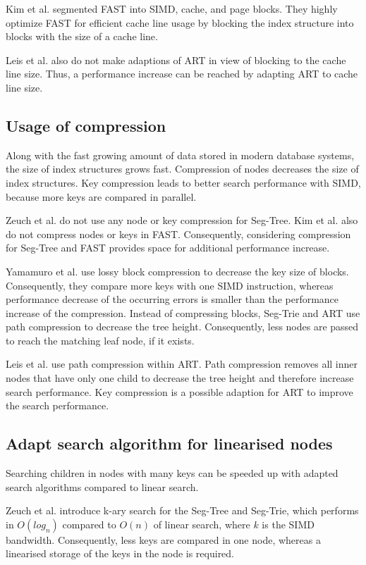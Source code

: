 \documentclass[conference]{IEEEtran}
\begin{document}
Kim et al. segmented FAST into SIMD, cache, and page blocks. They highly optimize FAST for efficient cache line usage by blocking the index structure into blocks with the size of a cache line.

Leis et al. also do not make adaptions of ART in view of blocking to the cache line size. Thus, a performance increase can be reached by adapting ART to cache line size.
\subsection{Usage of compression}
Along with the fast growing amount of data stored in modern database systems, the size of index structures grows fast. Compression of nodes decreases the size of index structures. Key compression leads to better search performance with SIMD, because more keys are compared in parallel.

Zeuch et al. do not use any node or key compression for Seg-Tree. Kim et al. also do not compress nodes or keys in FAST. Consequently, considering compression for Seg-Tree and FAST provides space for additional performance increase.

Yamamuro et al. use lossy block compression to decrease the key size of blocks. Consequently, they compare more keys with one SIMD instruction, whereas performance decrease of the occurring errors is smaller than the performance increase of the compression. Instead of compressing blocks, Seg-Trie and ART use path compression to decrease the tree height. Consequently, less nodes are passed to reach the matching leaf node, if it exists.

Leis et al. use path compression within ART. Path compression removes all inner nodes that have only one child to decrease the tree height and therefore increase search performance. Key compression is a possible adaption for ART to improve the search performance.

\subsection{Adapt search algorithm for linearised nodes}
Searching children in nodes with many keys can be speeded up with adapted search algorithms compared to linear search.

Zeuch et al. introduce k-ary search for the Seg-Tree and Seg-Trie, which performs in $O(log_n)$ compared to $O(n)$ of linear search, where $k$ is the SIMD bandwidth. Consequently, less keys are compared in one node, whereas a linearised storage of the keys in the node is required. 
\end{document}
